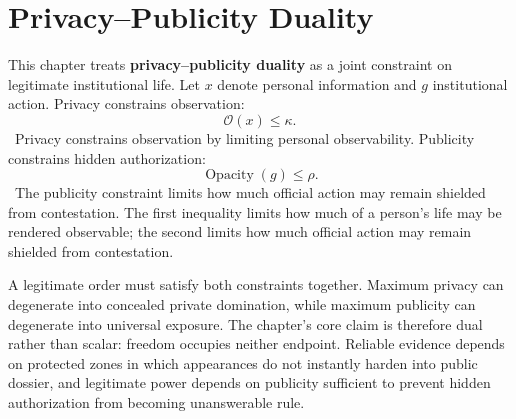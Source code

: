 
\chapter{Privacy--Publicity Duality}
\label{ch:ch075}

This chapter treats \textbf{privacy--publicity duality} as a joint constraint on legitimate institutional life. Let \(x\) denote personal information and \(g\) institutional action. Privacy constrains observation:
\[
\mathcal O(x)\leq \kappa.
\]
\ToyModel\ Privacy constrains observation by limiting personal observability.
Publicity constrains hidden authorization:
\[
\operatorname{Opacity}(g)\leq \rho.
\]
\ToyModel\ The publicity constraint limits how much official action may remain shielded from contestation.
The first inequality limits how much of a person's life may be rendered observable; the second limits how much official action may remain shielded from contestation.

A legitimate order must satisfy both constraints together. Maximum privacy can degenerate into concealed private domination, while maximum publicity can degenerate into universal exposure. The chapter's core claim is therefore dual rather than scalar: freedom occupies neither endpoint. Reliable evidence depends on protected zones in which appearances do not instantly harden into public dossier, and legitimate power depends on publicity sufficient to prevent hidden authorization from becoming unanswerable rule.
